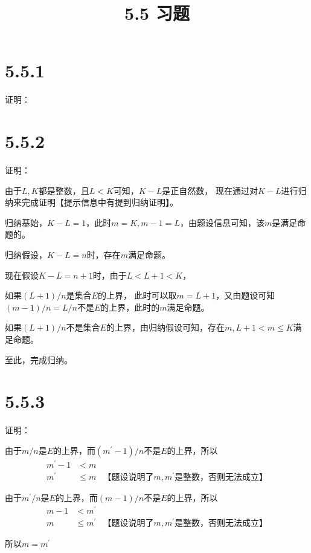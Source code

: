 \documentclass{article}
\theoremstyle{mystyle}
\begin{document}
\title{5.5 习题}
\maketitle

\section*{5.5.1}

证明：

\section*{5.5.2}

证明：

由于$L,K$都是整数，且$L < K$可知，$K - L$是正自然数，
现在通过对$K - L$进行归纳来完成证明【提示信息中有提到归纳证明】。

归纳基始，$K-L=1$，此时$m=K,m-1=L$，由题设信息可知，该$m$是满足命题的。

归纳假设，$K-L=n$时，存在$m$满足命题。

现在假设$K-L=n+1$时，由于$L < L + 1 < K$，

如果$(L + 1)/n$是集合$E$的上界，
此时可以取$m=L+1$，又由题设可知$(m-1)/n=L/n$不是$E$的上界，此时的$m$满足命题。

如果$(L + 1)/n$不是集合$E$的上界，由归纳假设可知，存在$m, L+1 < m \leq K$满足命题。

至此，完成归纳。

\section*{5.5.3}

证明：

由于$m/n$是$E$的上界，而$(m^\prime -1)/n$不是$E$的上界，所以
\begin{align*}
  m^\prime -1 & < m                                           \\
  m^\prime    & \leq m & \text{【题设说明了$m,m^\prime$是整数，否则无法成立】}
\end{align*}

由于$m^\prime/n$是$E$的上界，而$(m -1)/n$不是$E$的上界，所以
\begin{align*}
  m - 1 & < m^\prime                                           \\
  m     & \leq m^\prime & \text{【题设说明了$m,m^\prime$是整数，否则无法成立】}
\end{align*}

所以$m = m^\prime$
\end{document}
